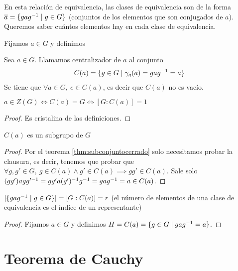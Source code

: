 En esta relación de equivalencia, las clases de equivalencia son de la forma $\overline{a} = \{gag^{-1} \mid g \in G\}$ (conjuntos de los elementos que son conjugados de $a$). Queremos saber cuántos elementos hay en cada clase de equivalencia.

Fijamos $a \in G$ y definimos

\begin{dfn}
	\label{dfn:centralizador}
	Sea $a \in G$. Llamamos centralizador de $a$ al conjunto
	\begin{align}
	C(a) = \{g \in G \mid \gamma_g(a) = g a g^{-1} = a\}
	\end{align}
	Se tiene que $\forall a \in G,\ e \in C(a)$, es decir que $C(a)$ no es vacío.
\end{dfn}

\begin{pro}
	$a \in Z(G) \iff C(a) = G \iff [G:C(a)] = 1$
\end{pro}

\begin{proof}
	Es cristalina de las definiciones.
\end{proof}

\begin{pro}
	$C(a)$ es un subgrupo de $G$
\end{pro}

\begin{proof}
	Por el teorema \ref{thm:subconjuntocerrado} solo necesitamos probar la clausura, es decir, tenemos que probar que $\forall g,g' \in G,\ g \in C(a) \land g' \in C(a) \implies gg' \in C(a)$. Sale solo $(gg')agg'^{-1} = gg'a(g')^{-1}g^{-1} = gag^{-1} = a \in C(a)$.
\end{proof}

\begin{pro}
	\label{pro:cardinalcajas}
	$|\{gag^{-1} \mid g \in G\}| = [G:C(a)] = r$ (el número de elementos de una clase de equivalencia es el índice de un representante)
\end{pro}

\begin{proof}
	Fijamos $a \in G$ y definimos $H = C(a) = \{g \in G \mid gag^{-1} = a\}$.
\end{proof}



\section{Teorema de Cauchy}


